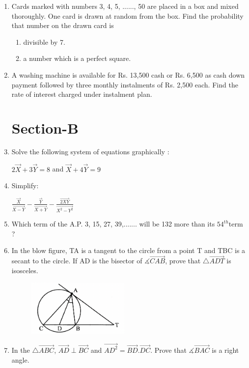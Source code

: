 \documentclass[journal,12pt,twocolumn]{IEEEtran}
\begin{document}
\begin{enumerate}
\begin{figure}[h!]
 \end{figure}
 \medskip
\item Cards marked with numbers 3, 4, 5, ......, 50 are placed in a box and mixed thoroughly. One card is drawn at random from the box. Find the probability that number on the drawn card is
\begin{enumerate}
\item divisible by 7.
\item a number which is a perfect square.
\end{enumerate}
 \medskip
\item A washing machine is available for Rs. 13,500 cash or Rs. 6,500 as cash down payment followed by three monthly instalments of Rs. 2,500 each. Find the rate of interest charged under instalment plan.
\bigskip
\section{Section-B}
\item Solve the following system of equations graphically :
\begin{center}
$2\vec{X}+3\vec{Y}=8$ and $\vec{X}+4\vec{Y}=9$\\
\end{center}
\medskip
\item Simplify:
\begin{center}
$\displaystyle\frac{\vec{X}}{\vec{X-Y}}-\displaystyle\frac{\vec{Y}}{\vec{X+Y}}-\displaystyle\frac{\vec{2XY}}{\vec{X^2-Y^2}}$
\end{center}
\medskip
\item Which term of the A.P. 3, 15, 27, 39,....... will be 132 more than its $54^{th} $term ?
\medskip
\item In the blow figure, TA is a tangent to the circle from a point T and TBC is a secant to the circle. If AD is the bisector of $\measuredangle\vec{CAB} $, prove that $\triangle\vec{ADT} $ is isosceles.
\begin{figure}[h!]
    \centering
    \includegraphics[width=5cm]{6.png}
 \end{figure}
 \medskip
 \item In  the $\triangle\vec{ABC}$, $\vec{AD} \perp \vec{BC}$ and $\vec{AD^2}= \vec{BD}.\vec{DC}$.  Prove that $\measuredangle\vec{BAC}$ is a right angle.

\end{enumerate}
\end{document}
